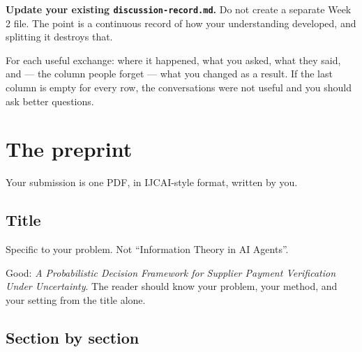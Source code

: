 \documentclass[11pt,a4paper]{article}
\begin{document}
\textbf{Update your existing \texttt{discussion-record.md}.} Do not create a separate Week 2 file.
The point is a continuous record of how your understanding developed, and splitting it destroys
that.

For each useful exchange: where it happened, what you asked, what they said, and --- the column
people forget --- what you changed as a result. If the last column is empty for every row, the
conversations were not useful and you should ask better questions.

\section{The preprint}
\label{sec:preprint}

Your submission is one PDF, in IJCAI-style format, written by you.

\subsection{Title}

Specific to your problem. Not ``Information Theory in AI Agents''.

Good: \emph{A Probabilistic Decision Framework for Supplier Payment Verification Under Uncertainty}.
The reader should know your problem, your method, and your setting from the title alone.

\subsection{Section by section}
\end{document}
